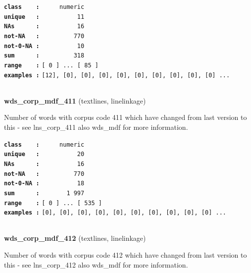 \documentclass[]{article}
\begin{document}
\textbf{\texttt{class\ \ \ \ :}} \texttt{~~~~~numeric}\\
\textbf{\texttt{unique\ \ \ :}} \texttt{~~~~~~~~~~11}\\
\textbf{\texttt{NAs\ \ \ \ \ \ :}} \texttt{~~~~~~~~~~16}\\
\textbf{\texttt{not-NA\ \ \ :}} \texttt{~~~~~~~~~770}\\
\textbf{\texttt{not-0-NA\ :}} \texttt{~~~~~~~~~~10}\\
\textbf{\texttt{sum\ \ \ \ \ \ :}} \texttt{~~~~~~~~~318}\\
\textbf{\texttt{range\ \ \ \ :}}
\texttt{{[}\ 0\ {]}\ ...\ {[}\ 85\ {]}}\\
\textbf{\texttt{examples\ :}}
\texttt{{[}12{]},\ {[}0{]},\ {[}0{]},\ {[}0{]},\ {[}0{]},\ {[}0{]},\ {[}0{]},\ {[}0{]},\ {[}0{]},\ {[}0{]}\ ...}\\

~

\textbf{wds\_corp\_mdf\_411} (textlines, linelinkage)

Number of words with corpus code 411 which have changed from last
version to this - see lns\_corp\_411 also wds\_mdf for more information.

\textbf{\texttt{class\ \ \ \ :}} \texttt{~~~~~numeric}\\
\textbf{\texttt{unique\ \ \ :}} \texttt{~~~~~~~~~~20}\\
\textbf{\texttt{NAs\ \ \ \ \ \ :}} \texttt{~~~~~~~~~~16}\\
\textbf{\texttt{not-NA\ \ \ :}} \texttt{~~~~~~~~~770}\\
\textbf{\texttt{not-0-NA\ :}} \texttt{~~~~~~~~~~18}\\
\textbf{\texttt{sum\ \ \ \ \ \ :}} \texttt{~~~~~~~1~997}\\
\textbf{\texttt{range\ \ \ \ :}}
\texttt{{[}\ 0\ {]}\ ...\ {[}\ 535\ {]}}\\
\textbf{\texttt{examples\ :}}
\texttt{{[}0{]},\ {[}0{]},\ {[}0{]},\ {[}0{]},\ {[}0{]},\ {[}0{]},\ {[}0{]},\ {[}0{]},\ {[}0{]},\ {[}0{]}\ ...}\\

~

\textbf{wds\_corp\_mdf\_412} (textlines, linelinkage)

Number of words with corpus code 412 which have changed from last
version to this - see lns\_corp\_412 also wds\_mdf for more information.
\end{document}

